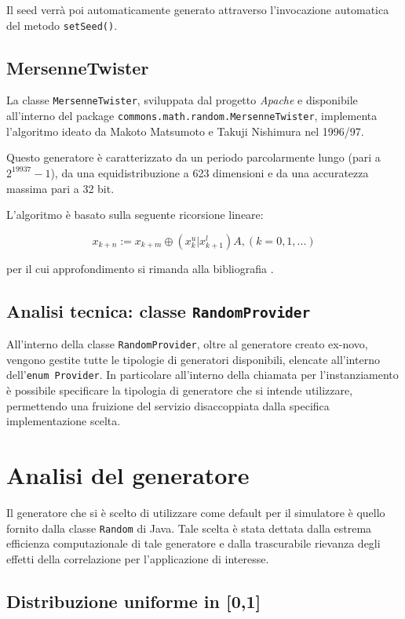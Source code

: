 Il seed verr\`a poi automaticamente generato attraverso l'invocazione automatica del metodo {\tt setSeed()}.

\subsection{MersenneTwister}

La classe {\tt MersenneTwister}, sviluppata dal progetto \emph{Apache} e disponibile all'interno del package {\tt commons.math.random.MersenneTwister}, implementa l'algoritmo ideato da Makoto Matsumoto e Takuji Nishimura nel 1996/97. 

Questo generatore \`e caratterizzato da un periodo parcolarmente lungo (pari a $2^{19937}-1$), da una equidistribuzione a 623 dimensioni e da una accuratezza massima pari a 32 bit.

L'algoritmo \`e basato sulla seguente ricorsione lineare:

$$x_{k+n}:=x_{k+m} \oplus (x_{k}^{u}|x_{k+1}^{l})A, (k=0,1,...)$$

per il cui approfondimento si rimanda alla bibliografia \cite{matsumoto}.

\subsection{Analisi tecnica: classe {\tt RandomProvider}}

All'interno della classe {\tt RandomProvider}, oltre al generatore creato ex-novo, vengono gestite tutte le tipologie di generatori disponibili, elencate all'interno dell'{\tt enum Provider}. In particolare all'interno della chiamata per l'instanziamento \`e possibile specificare la tipologia di generatore che si intende utilizzare, permettendo una fruizione del servizio disaccoppiata dalla specifica implementazione scelta.

\section{Analisi del generatore}

Il generatore che si \`e scelto di utilizzare come default per il simulatore \`e quello fornito dalla classe {\tt Random} di Java. Tale scelta \`e stata dettata dalla estrema efficienza computazionale di tale generatore e dalla trascurabile rievanza degli effetti della correlazione per l'applicazione di interesse.

\subsection{Distribuzione uniforme in [0,1]}

